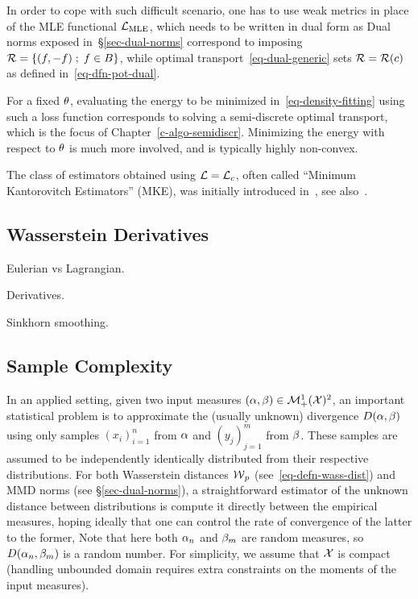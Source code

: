 In order to cope with such difficult scenario, one has to use weak metrics in place of the MLE functional $\mathcal{L}_{\text{MLE}}$, which needs to be written in dual form as 
Dual norms exposed in~\S\ref{sec-dual-norms} correspond to imposing $\mathcal{R} = \left\{ (f,-f) \;;\; f \in B \right\}$, while optimal transport~\eqref{eq-dual-generic} sets $\mathcal{R} = \mathcal{R}(c)$ as defined in~\eqref{eq-dfn-pot-dual}. 

For a fixed $\theta$, evaluating the energy to be minimized in~\eqref{eq-density-fitting} using such a loss function corresponds to solving a semi-discrete optimal transport, which is the focus of Chapter~\ref{c-algo-semidiscr}. Minimizing the energy with respect to $\theta$ is much more involved, and is typically highly non-convex.

The class of estimators obtained using $\mathcal{L}=\mathcal{L}_c$, often called ``Minimum Kantorovitch Estimators'' (MKE), was initially introduced in~\cite{bassetti2006minimum}, see also~\cite{CanasRosasco}.


\subsection{Wasserstein Derivatives}


Eulerian vs Lagrangian. 

Derivatives. 

Sinkhorn smoothing. 



\subsection{Sample Complexity}

In an applied setting, given two input measures $(\alpha,\beta) \in \mathcal{M}_+^1(\mathcal{X})^2$, an important statistical problem is to approximate the (usually unknown) divergence $D(\alpha,\beta)$ using only samples $(x_i)_{i=1}^n$ from $\alpha$ and $(y_j)_{j=1}^m$ from $\beta$. These samples are assumed to be independently identically distributed from their respective distributions. 
%
For both Wasserstein distances $\operatorname{\mathcal{W}}_p$ (see~\ref{eq-defn-wass-dist}) and MMD norms (see \S\ref{sec-dual-norms}), a straightforward estimator of the unknown distance between distributions is compute it directly between the empirical measures, hoping ideally that one can control the rate of convergence of the latter to the former,
Note that here both $\alpha_n$ and $\beta_m$ are random measures, so $D(\alpha_n,\beta_m)$ is a random number. 
% 
For simplicity, we assume that $\mathcal{X}$ is compact (handling unbounded domain requires extra constraints on the moments of the input measures).

